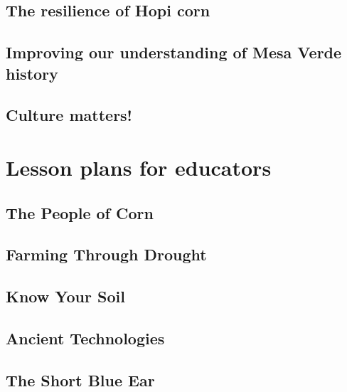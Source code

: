 \documentclass[12pt,]{krantz}
\theoremstyle{definition}
\theoremstyle{definition}
\theoremstyle{definition}
\theoremstyle{remark}
\begin{document}
\hypertarget{the-resilience-of-hopi-corn}{%
\section{The resilience of Hopi
corn}\label{the-resilience-of-hopi-corn}}

\hypertarget{improving-our-understanding-of-mesa-verde-history}{%
\section{Improving our understanding of Mesa Verde
history}\label{improving-our-understanding-of-mesa-verde-history}}

\hypertarget{culture-matters}{%
\section{Culture matters!}\label{culture-matters}}

\hypertarget{lesson-plans-for-educators}{%
\chapter{Lesson plans for educators}\label{lesson-plans-for-educators}}

\hypertarget{the-people-of-corn-1}{%
\section{The People of Corn}\label{the-people-of-corn-1}}

\hypertarget{farming-through-drought}{%
\section{Farming Through Drought}\label{farming-through-drought}}

\hypertarget{know-your-soil}{%
\section{Know Your Soil}\label{know-your-soil}}

\hypertarget{ancient-technologies}{%
\section{Ancient Technologies}\label{ancient-technologies}}

\hypertarget{the-short-blue-ear}{%
\section{The Short Blue Ear}\label{the-short-blue-ear}}
\end{document}
